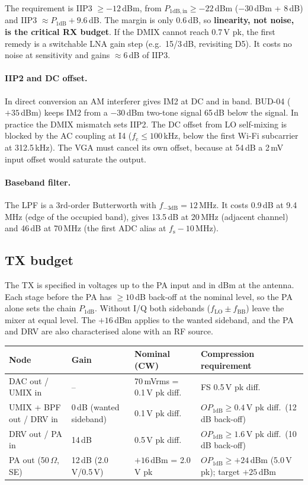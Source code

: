 \medskip
\noindent The requirement is IIP3 $\geq -12$\,dBm, from $P_\mathrm{1dB,in} \geq -22$\,dBm
($-30$\,dBm + 8\,dB) and IIP3 $\approx P_\mathrm{1dB} + 9.6$\,dB. The margin is only
0.6\,dB, so \textbf{linearity, not noise, is the critical RX budget}. If the DMIX
cannot reach 0.7\,V pk, the first remedy is a switchable LNA gain step
(e.g.\ 15/3\,dB, revisiting D5). It costs no noise at sensitivity and gains
$\approx 6$\,dB of IIP3.

\paragraph{IIP2 and DC offset.}
In direct conversion an AM interferer gives IM2 at DC and in band. BUD-04
($+35$\,dBm) keeps IM2 from a $-30$\,dBm two-tone signal 65\,dB below the signal. In
practice the DMIX mismatch sets IIP2. The DC offset from LO self-mixing is blocked
by the AC coupling at I4 ($f_\mathrm{c} \leq 100$\,kHz, below the first Wi-Fi
subcarrier at 312.5\,kHz). The VGA must cancel its own offset, because at 54\,dB a
2\,mV input offset would saturate the output.

\paragraph{Baseband filter.}
The LPF is a 3rd-order Butterworth with $f_{-3\mathrm{dB}} = 12$\,MHz. It costs
0.9\,dB at 9.4\,MHz (edge of the occupied band), gives 13.5\,dB at 20\,MHz (adjacent
channel) and 46\,dB at 70\,MHz (the first ADC alias at $f_\mathrm{s} - 10$\,MHz).

\subsection{TX budget}\label{tab:integrator-tx-levels}
The TX is specified in voltages up to the PA input and in dBm at the antenna. Each
stage before the PA has $\geq 10$\,dB back-off at the nominal level, so the PA alone
sets the chain $P_\mathrm{1dB}$. Without I/Q both sidebands ($f_\mathrm{LO} \pm f_\mathrm{BB}$)
leave the mixer at equal level. The $+16$\,dBm applies to the wanted sideband, and the
PA and DRV are also characterised alone with an RF source.

\par\medskip\noindent\small
\begin{tabularx}{\textwidth}{@{}l l L L@{}}
	\toprule
	\textbf{Node} & \textbf{Gain} & \textbf{Nominal (CW)} & \textbf{Compression requirement} \\
	\midrule
	DAC out / UMIX in & -- & 70\,mVrms = 0.1\,V pk diff. & FS 0.5\,V pk diff. \\
	UMIX + BPF out / DRV in & 0\,dB (wanted sideband) & 0.1\,V pk diff. & $OP_\mathrm{1dB} \geq 0.4$\,V pk diff.\ (12\,dB back-off) \\
	DRV out / PA in & 14\,dB & 0.5\,V pk diff. & $OP_\mathrm{1dB} \geq 1.6$\,V pk diff.\ (10\,dB back-off) \\
	PA out (50\,$\Omega$, SE) & 12\,dB (2.0\,V/0.5\,V) & $+16$\,dBm = 2.0\,V pk & $OP_\mathrm{1dB} \geq +24$\,dBm (5.0\,V pk); target $+25$\,dBm \\
	\bottomrule
\end{tabularx}\par\normalsize

